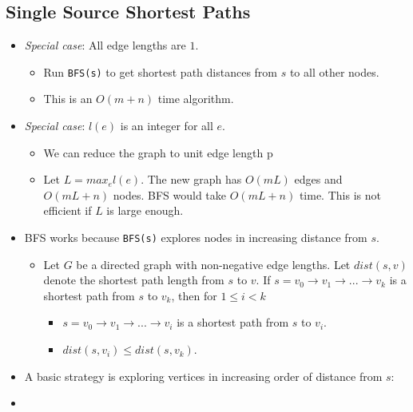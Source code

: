 \subsection{Single Source Shortest Paths}
\begin{itemize}
    \item \textit{Special case}: All edge lengths are $1$.
    \begin{itemize}
        \item Run \texttt{BFS(s)} to get shortest path distances from $s$ to all other nodes.
        \item This is an $O(m + n)$ time algorithm.
    \end{itemize}
    \item \textit{Special case}: $l(e)$ is an integer for all $e$.
    \begin{itemize}
        \item We can reduce the graph to unit edge length p
        \item Let $L = max_e l(e)$. The new graph has $O(mL)$ edges and $O(mL + n)$ nodes. BFS would take $O(mL + n)$ time. This is not efficient if $L$ is large enough.
    \end{itemize}
    \item BFS works because \texttt{BFS(s)} explores nodes in increasing distance from $s$.
    \begin{itemize}
        \item Let $G$ be a directed graph with non-negative edge lengths. Let $dist(s, v)$ denote the shortest path length from $s$ to $v$. If $s = v_0 \rightarrow v_1 \rightarrow ... \rightarrow v_k$ is a shortest path from $s$ to $v_k$, then for $1 \leq i < k$
        \begin{itemize}
            \item $s = v_0 \rightarrow v_1 \rightarrow ... \rightarrow v_i$ is a shortest path from $s$ to $v_i$.
            \item $dist(s, v_i) \leq dist(s, v_k)$.
        \end{itemize}
    \end{itemize}
    \item A basic strategy is exploring vertices in increasing order of distance from $s$:
    \item[] 
\end{itemize}

